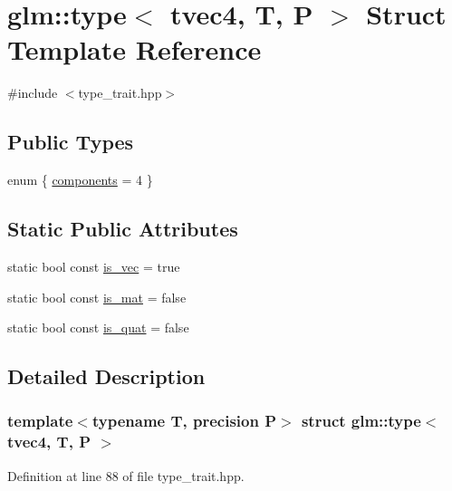 \hypertarget{structglm_1_1type_3_01tvec4_00_01_t_00_01_p_01_4}{}\section{glm\+::type$<$ tvec4, T, P $>$ Struct Template Reference}
\label{structglm_1_1type_3_01tvec4_00_01_t_00_01_p_01_4}


{\ttfamily \#include $<$type\+\_\+trait.\+hpp$>$}

\subsection*{Public Types}
\begin{DoxyCompactItemize}
\item 
enum \{ \mbox{\hyperlink{structglm_1_1type_3_01tvec4_00_01_t_00_01_p_01_4_ac22629bf2a70fe88597c6cc55469bdffad536a7b1b80cbeebc90ea091fbf001c7}{components}} = 4
 \}
\end{DoxyCompactItemize}
\subsection*{Static Public Attributes}
\begin{DoxyCompactItemize}
\item 
static bool const \mbox{\hyperlink{structglm_1_1type_3_01tvec4_00_01_t_00_01_p_01_4_a7eadb533939a5fc3bc00f4fa4682e578}{is\+\_\+vec}} = true
\item 
static bool const \mbox{\hyperlink{structglm_1_1type_3_01tvec4_00_01_t_00_01_p_01_4_a1dbc37d661357604961a167bedc7e69e}{is\+\_\+mat}} = false
\item 
static bool const \mbox{\hyperlink{structglm_1_1type_3_01tvec4_00_01_t_00_01_p_01_4_aa3a4a4b0e7b22e095974264f9e1e1e40}{is\+\_\+quat}} = false
\end{DoxyCompactItemize}


\subsection{Detailed Description}
\subsubsection*{template$<$typename T, precision P$>$\newline
struct glm\+::type$<$ tvec4, T, P $>$}



Definition at line 88 of file type\+\_\+trait.\+hpp.



